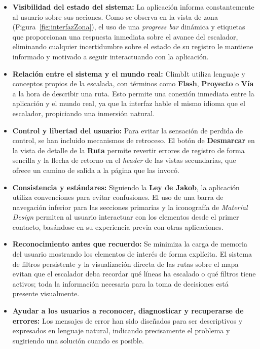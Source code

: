 \begin{itemize}
    \item \textbf{Visibilidad del estado del sistema:} La aplicación informa constantemente al usuario sobre sus acciones. Como se observa en la vista de zona (Figura~\ref{fig:interfazZona}), el uso de una \textit{progress bar} dinámica y etiquetas que proporcionan una respuesta inmediata sobre el avance del escalador, eliminando cualquier incertidumbre sobre el estado de su registro le mantiene informado y motivado a seguir interactuando con la aplicación.
    
    \item \textbf{Relación entre el sistema y el mundo real:} ClimbIt utiliza lenguaje y conceptos propios de la escalada, con términos como \textbf{Flash}, \textbf{Proyecto} o \textbf{Vía} a la hora de describir una ruta. Esto permite una conexión inmediata entre la aplicación y el mundo real, ya que la interfaz hable el mismo idioma que el escalador, propiciando una inmersión natural.
    
    \item \textbf{Control y libertad del usuario:} Para evitar la sensación de perdida de control, se han incluido mecanismos de retroceso. El botón de \textbf{Desmarcar} en la vista de detalle de la \textbf{Ruta} permite revertir errores de registro de forma sencilla y la flecha de retorno en el \textit{header} de las vistas secundarias, que ofrece un camino de salida a la página que las invocó.
    
    \item \textbf{Consistencia y estándares:} Siguiendo la \textbf{Ley de Jakob}, la aplicación utiliza convenciones para evitar confusiones. El uso de una barra de navegación inferior para las secciones primarias y la iconografía de \textit{Material Design} permiten al usuario interactuar con los elementos desde el primer contacto, basándose en su experiencia previa con otras aplicaciones.
    
    \item \textbf{Reconocimiento antes que recuerdo:} Se minimiza la carga de memoria del usuario mostrando los elementos de interés de forma explícita. El sistema de filtros persistente y la visualización directa de las rutas sobre el mapa evitan que el escalador deba recordar qué líneas ha escalado o qué filtros tiene activos; toda la información necesaria para la toma de decisiones está presente visualmente.
    
    \item \textbf{Ayudar a los usuarios a reconocer, diagnosticar y recuperarse de errores:} Los mensajes de error han sido diseñados para ser descriptivos y expresados en lenguaje natural, indicando precisamente el problema y sugiriendo una solución cuando es posible.
    

\end{itemize}
